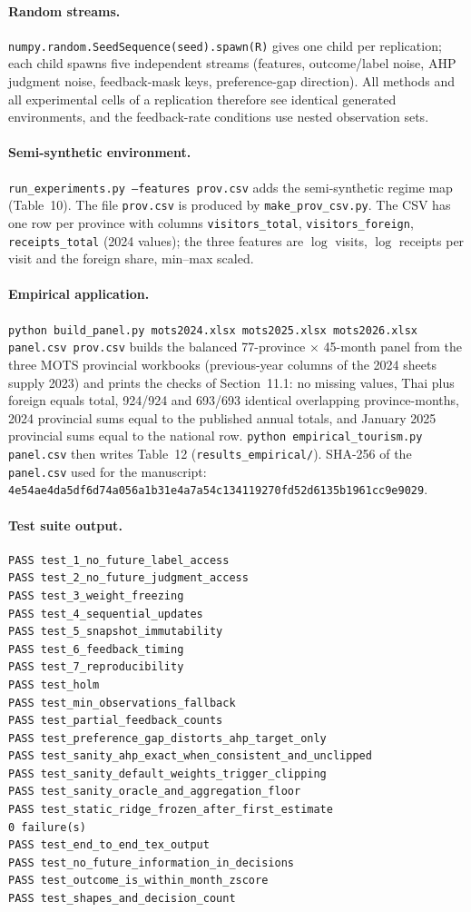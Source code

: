 \documentclass[10pt,a4paper]{article}
\begin{document}
\paragraph{Random streams.} \texttt{numpy.random.SeedSequence(seed).spawn(R)} gives one child per replication; each child
spawns five independent streams (features, outcome/label noise, AHP judgment noise, feedback-mask keys, preference-gap
direction). All methods and all experimental cells of a replication therefore see identical generated environments, and the
feedback-rate conditions use nested observation sets.

\paragraph{Semi-synthetic environment.} \texttt{run\_experiments.py --features prov.csv} adds the semi-synthetic regime map
(Table~10). The file \texttt{prov.csv} is produced by \texttt{make\_prov\_csv.py}. The CSV has one row per province with columns \texttt{visitors\_total}, \texttt{visitors\_foreign},
\texttt{receipts\_total} (2024 values); the three features are $\log$ visits, $\log$ receipts per visit and the foreign share,
min--max scaled.

\paragraph{Empirical application.} \texttt{python build\_panel.py mots2024.xlsx mots2025.xlsx mots2026.xlsx panel.csv prov.csv} builds the balanced 77-province $\times$ 45-month panel from the three MOTS provincial workbooks (previous-year columns of the 2024 sheets supply 2023) and prints the checks of Section~11.1: no missing values, Thai plus foreign equals total, 924/924 and 693/693 identical overlapping province-months, 2024 provincial sums equal to the published annual totals, and January 2025 provincial sums equal to the national row. \texttt{python empirical\_tourism.py panel.csv} then writes Table~12 (\texttt{results\_empirical/}). SHA-256 of the \texttt{panel.csv} used for the manuscript: \texttt{4e54ae4da5df6d74a056a1b31e4a7a54c134119270fd52d6135b1961cc9e9029}.

\paragraph{Test suite output.}
\begin{lstlisting}[numbers=none]
PASS test_1_no_future_label_access
PASS test_2_no_future_judgment_access
PASS test_3_weight_freezing
PASS test_4_sequential_updates
PASS test_5_snapshot_immutability
PASS test_6_feedback_timing
PASS test_7_reproducibility
PASS test_holm
PASS test_min_observations_fallback
PASS test_partial_feedback_counts
PASS test_preference_gap_distorts_ahp_target_only
PASS test_sanity_ahp_exact_when_consistent_and_unclipped
PASS test_sanity_default_weights_trigger_clipping
PASS test_sanity_oracle_and_aggregation_floor
PASS test_static_ridge_frozen_after_first_estimate
0 failure(s)
PASS test_end_to_end_tex_output
PASS test_no_future_information_in_decisions
PASS test_outcome_is_within_month_zscore
PASS test_shapes_and_decision_count
\end{lstlisting}
\end{document}
